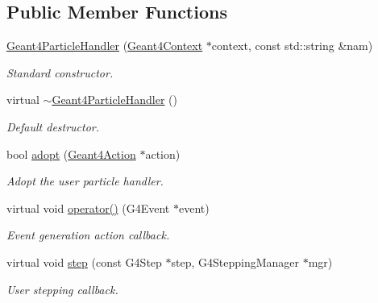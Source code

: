 \subsection*{Public Member Functions}
\begin{DoxyCompactItemize}
\item 
\hyperlink{class_d_d4hep_1_1_simulation_1_1_geant4_particle_handler_a71d231fc9a93ebe885e78377577acb34}{Geant4ParticleHandler} (\hyperlink{class_d_d4hep_1_1_simulation_1_1_geant4_context}{Geant4Context} $\ast$context, const std::string \&nam)
\begin{DoxyCompactList}\small\item\em Standard constructor. \item\end{DoxyCompactList}\item 
virtual \hyperlink{class_d_d4hep_1_1_simulation_1_1_geant4_particle_handler_a38b97e54b48b0df16a7205a683a68180}{$\sim$Geant4ParticleHandler} ()
\begin{DoxyCompactList}\small\item\em Default destructor. \item\end{DoxyCompactList}\item 
bool \hyperlink{class_d_d4hep_1_1_simulation_1_1_geant4_particle_handler_a2f69aadfffab73e1fb98f5cd3a1e3ebb}{adopt} (\hyperlink{class_d_d4hep_1_1_simulation_1_1_geant4_action}{Geant4Action} $\ast$action)
\begin{DoxyCompactList}\small\item\em Adopt the user particle handler. \item\end{DoxyCompactList}\item 
virtual void \hyperlink{class_d_d4hep_1_1_simulation_1_1_geant4_particle_handler_a239e9338d41588f5dcfc3ea012aba02a}{operator()} (G4Event $\ast$event)
\begin{DoxyCompactList}\small\item\em Event generation action callback. \item\end{DoxyCompactList}\item 
virtual void \hyperlink{class_d_d4hep_1_1_simulation_1_1_geant4_particle_handler_abb534226cfb8d022077d48681226a179}{step} (const G4Step $\ast$step, G4SteppingManager $\ast$mgr)
\begin{DoxyCompactList}\small\item\em User stepping callback. \item\end{DoxyCompactList}\item 

\end{DoxyCompactItemize}
